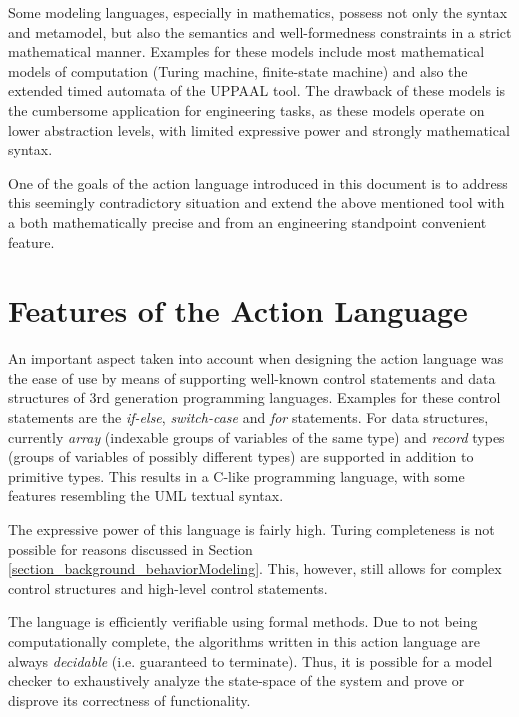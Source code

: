 Some modeling languages, especially in mathematics, possess not only the syntax and metamodel, but also the semantics and well-formedness constraints in a strict mathematical manner. Examples for these models include most mathematical models of computation (Turing machine, finite-state machine) and also the extended timed automata of the UPPAAL tool. The drawback of these models is the cumbersome application for engineering tasks, as these models operate on lower abstraction levels, with limited expressive power and strongly mathematical syntax.

One of the goals of the action language introduced in this document is to address this seemingly contradictory situation and extend the above mentioned tool with a both mathematically precise and from an engineering standpoint convenient feature.

\section{Features of the Action Language} \label{section_intro_features}

An important aspect taken into account when designing the action language was the ease of use by means of supporting well-known control statements and data structures of 3rd generation programming languages. Examples for these control statements are the \textit{if-else}, \textit{switch-case} and \textit{for} statements. For data structures, currently \textit{array} (indexable groups of variables of the same type) and \textit{record} types (groups of variables of possibly different types) are supported in addition to primitive types. This results in a C-like programming language, with some features resembling the UML textual syntax.

The expressive power of this language is fairly high. Turing completeness is not possible for reasons discussed in Section \ref{section_background_behaviorModeling}. This, however, still allows for complex control structures and high-level control statements.

The language is efficiently verifiable using formal methods. Due to not being computationally complete, the algorithms written in this action language are always \textit{decidable} (i.e. guaranteed to terminate). Thus, it is possible for a model checker to exhaustively analyze the state-space of the system and prove or disprove its correctness of functionality.

